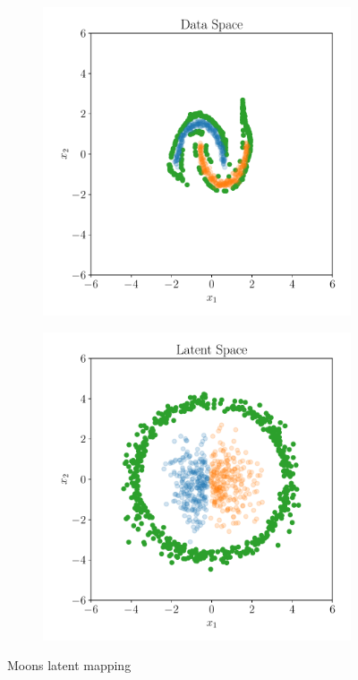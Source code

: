 \begin{figure}[htpb]
\begin{subfigure}[]{0.4\textwidth}
        \caption{}
        \label{fig:}
    \end{subfigure}
    \begin{subfigure}[]{0.4\textwidth}
        \centering
    \includegraphics[width=\linewidth]{figures/toy_example/moons/gumbel_samples.pdf}
        \caption{}
        \label{fig:}
    \end{subfigure}
    \begin{subfigure}[]{0.4\textwidth}
        \centering
    \includegraphics[width=\linewidth]{figures/toy_example/moons/latent_space_with_outliers.pdf}
        \caption{}
        \label{fig:}
    \end{subfigure}
    \caption{Moons latent mapping}%
    \label{fig:latent_moons}
\end{figure}

